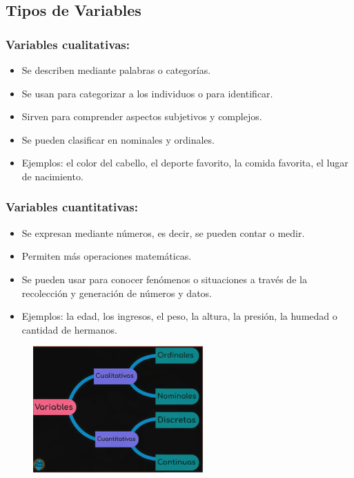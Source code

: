 \documentclass[12pt, letterpaper]{article}
\begin{document}
\subsection{Tipos de Variables}

\subsubsection{Variables cualitativas:}
\begin{itemize}
	\item Se describen mediante palabras o categorías.
	\item Se usan para categorizar a los individuos o para identificar.
	\item Sirven para comprender aspectos subjetivos y complejos.
	\item Se pueden clasificar en nominales y ordinales.
	\item Ejemplos: el color del cabello, el deporte favorito, la comida favorita, el lugar de nacimiento.
\end{itemize}

\subsubsection{Variables cuantitativas:}
\begin{itemize}
	\item Se expresan mediante números, es decir, se pueden contar o medir.
	\item Permiten más operaciones matemáticas.
	\item Se pueden usar para conocer fenómenos o situaciones a través de la recolección y generación de números y datos.
	\item Ejemplos: la edad, los ingresos, el peso, la altura, la presión, la humedad o cantidad de hermanos.
\end{itemize}

\begin{figure}[htbp]
	\centering
	\includegraphics[width=0.58\textwidth]{variables}
	\caption{}
	\label{fig:variables}
\end{figure}
\end{document}
